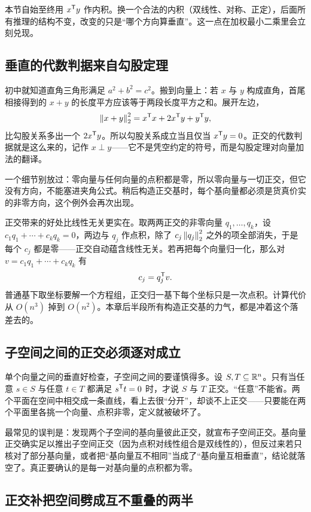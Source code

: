 本节自始至终用 \(x^{\mathsf{T}}y\) 作内积。换一个合法的内积（双线性、对称、正定），后面所有推理的结构不变，改变的只是``哪个方向算垂直''。这一点在加权最小二乘里会立刻兑现。

\subsection{垂直的代数判据来自勾股定理}

初中就知道直角三角形满足 \(a^2+b^2=c^2\)。搬到向量上：若 \(x\) 与 \(y\) 构成直角，首尾相接得到的 \(x+y\) 的长度平方应该等于两段长度平方之和。展开左边，
\[
\left\lVert x+y\right\rVert_2^2=x^{\mathsf{T}}x+2x^{\mathsf{T}}y+y^{\mathsf{T}}y ,
\]
比勾股关系多出一个 \(2x^{\mathsf{T}}y\)。所以勾股关系成立当且仅当 \(x^{\mathsf{T}}y=0\)。正交的代数判据就是这么来的，记作 \(x\perp y\)——它不是凭空约定的符号，而是勾股定理对向量加法的翻译。

一个细节别放过：零向量与任何向量的点积都是零，所以零向量与一切正交，但它没有方向，不能塞进夹角公式。稍后构造正交基时，每个基向量都必须是货真价实的非零方向，这个例外会再次出现。

正交带来的好处比线性无关更实在。取两两正交的非零向量 \(q_1,\ldots,q_k\)，设 \(c_1q_1+\cdots+c_kq_k=0\)，两边与 \(q_j\) 作点积，除了 \(c_j\left\lVert q_j\right\rVert_2^2\) 之外的项全部消失，于是每个 \(c_j\) 都是零——正交自动蕴含线性无关。若再把每个向量归一化，那么对 \(v=c_1q_1+\cdots+c_kq_k\) 有
\[
c_j=q_j^{\mathsf{T}}v .
\]
普通基下取坐标要解一个方程组，正交归一基下每个坐标只是一次点积。计算代价从 \(O(n^3)\) 掉到 \(O(n^2)\)。本章后半段所有构造正交基的力气，都是冲着这个落差去的。

\subsection{子空间之间的正交必须逐对成立}

单个向量之间的垂直好检查，子空间之间的要谨慎得多。设 \(S,T\subseteq\mathbb{R}^n\)。只有当任意 \(s\in S\) 与任意 \(t\in T\) 都满足 \(s^{\mathsf{T}}t=0\) 时，才说 \(S\) 与 \(T\) 正交。``任意''不能省。两个平面在空间中相交成一条直线，看上去很``分开''，却谈不上正交——只要能在两个平面里各挑一个向量、点积非零，定义就被破坏了。

最常见的误判是：发现两个子空间的基向量彼此正交，就宣布子空间正交。基向量正交确实足以推出子空间正交（因为点积对线性组合是双线性的），但反过来若只核对了部分基向量，或者把``基向量互不相同''当成了``基向量互相垂直''，结论就落空了。真正要确认的是每一对基向量的点积都为零。

\subsection{正交补把空间劈成互不重叠的两半}


